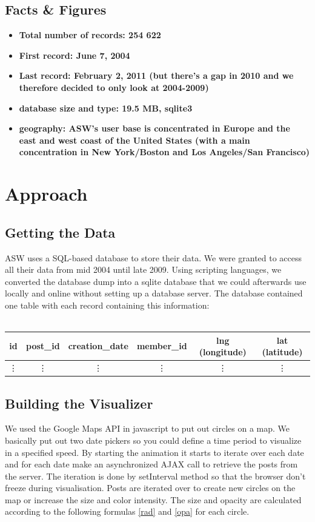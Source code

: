 \documentclass[11pt,a4paper,english]{article}
\begin{document}
		\subsection{Facts \& Figures}
			\begin{itemize}
				\item \bf Total number of records: \rm 254 622
				\item \bf First record: \rm June 7, 2004
				\item \bf Last record: \rm February 2, 2011 (but there's a gap in 2010 and we therefore decided to only look at 2004-2009)
				\item \bf database size and type: \rm 19.5 MB, sqlite3
				\item \bf geography: \rm ASW's user base is concentrated in Europe and the east and west coast of the United States (with a main concentration in New York/Boston and Los Angeles/San Francisco)
			\end{itemize}
			 		
	\section{Approach}
		\subsection{Getting the Data}
		ASW uses a SQL-based database to store their data. We were granted to access all their data from mid 2004 until late 2009. Using scripting languages, we converted the database dump into a sqlite database that we could afterwards use locally and online without setting up a database server. The database contained one table with each record containing this information: 
		\\\\\begin{tabular}{|c|c|c|c|c|c|}\hline id & post\_id & creation\_date & member\_id & lng (longitude) & lat (latitude) \\\hline \vdots & \vdots & \vdots & \vdots & \vdots & \vdots \\\hline \end{tabular}
		
		\subsection{Building the Visualizer}
		We used the Google Maps API in javascript to put out circles on a map. We basically put out two date pickers so you could define a time period to visualize in a specified speed. By starting the animation it starts to iterate over each date and for each date make an asynchronized AJAX call to retrieve the posts from the server. The iteration is done by setInterval method so that the browser don't freeze during visualisation. Posts are iterated over to create new circles on the map or increase the size and color intensity. The size and opacity are calculated according to the following formulas \ref{rad} and \ref{opa} for each circle.
\end{document}
